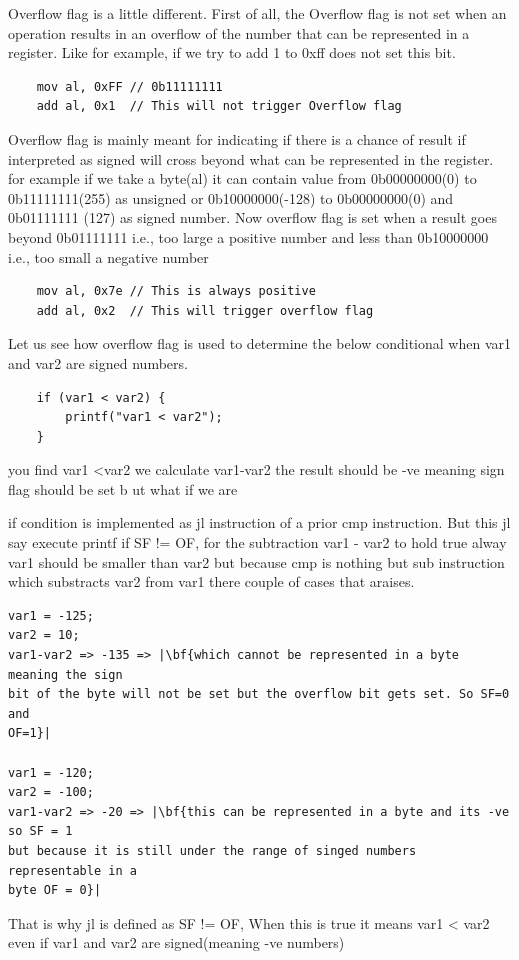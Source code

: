 \documentclass{article}
\begin{document}
Overflow flag is a little different. First of all, the Overflow flag is not set
when an operation results in an overflow of the number that can be represented
in a register. Like for example, if we try to add 1 to 0xff does not set this
bit.
\begin{verbatim}
    mov al, 0xFF // 0b11111111
    add al, 0x1  // This will not trigger Overflow flag
\end{verbatim}
Overflow flag is mainly meant for indicating if there is a chance of result if
interpreted as signed will cross beyond what can be represented in the register.
for example if we take a byte(al) it can contain value from 0b00000000(0) to
0b11111111(255) as unsigned or 0b10000000(-128) to 0b00000000(0) and 0b01111111
(127) as signed number. Now overflow flag is set when a result goes beyond
0b01111111 i.e., too large a positive number and less than 0b10000000 i.e., too
small a negative number

\begin{verbatim}
    mov al, 0x7e // This is always positive
    add al, 0x2  // This will trigger overflow flag
\end{verbatim}

Let us see how overflow flag is used to determine the below conditional when
var1 and var2 are signed numbers.
\begin{verbatim}
    if (var1 < var2) {
        printf("var1 < var2");
    }
\end{verbatim}
you find var1 \textless var2 we calculate var1-var2 the result should be -ve
meaning sign flag should be set b ut what if we are

if condition is implemented as jl instruction of a prior cmp instruction. But
this jl say execute printf if SF != OF, for the subtraction var1 - var2 to hold
true alway var1 should be smaller than var2 but because cmp is nothing but sub
instruction which substracts var2 from var1 there couple of cases that araises.
\begin{verbatim}
var1 = -125;
var2 = 10;
var1-var2 => -135 => |\bf{which cannot be represented in a byte meaning the sign
bit of the byte will not be set but the overflow bit gets set. So SF=0 and
OF=1}|

var1 = -120;
var2 = -100;
var1-var2 => -20 => |\bf{this can be represented in a byte and its -ve so SF = 1
but because it is still under the range of singed numbers representable in a
byte OF = 0}|
\end{verbatim}
That is why jl is defined as SF != OF, When this is true it means var1 < var2
even if var1 and var2 are signed(meaning -ve numbers)
\end{document}
